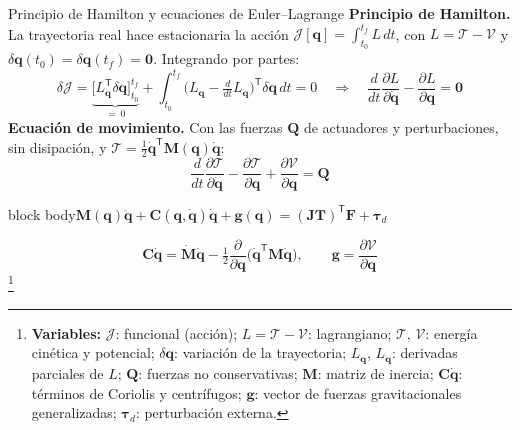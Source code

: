 \documentclass[aspectratio=169,10pt]{beamer}
\newcommand{\vect}[1]{\bm{#1}}
\newcommand{\T}{^{\mathsf{T}}}
\newcommand{\variables}[1]{\begingroup\renewcommand{\thefootnote}{}\footnote[frame]{\textbf{Variables:} #1}\addtocounter{footnote}{-1}\endgroup}
\newcommand{\resultado}[1]{\par\smallskip\begin{beamercolorbox}[rounded=true,sep=0.45em,center]{block body}#1\end{beamercolorbox}\par\smallskip}
\begin{document}
\begin{frame}{Principio de Hamilton y ecuaciones de Euler--Lagrange}
\small
\textbf{Principio de Hamilton.} La trayectoria real hace estacionaria la acción $\mathcal J[\vect q] = \int_{t_0}^{t_f}L\,dt$, con $L = \mathcal T - \mathcal V$ y $\delta\vect q(t_0) = \delta\vect q(t_f) = \vect 0$. Integrando por partes:
\[
\delta\mathcal J = \underbrace{\Big[L_{\dot{\vect q}}\T\delta\vect q\Big]_{t_0}^{t_f}}_{=\,0} + \int_{t_0}^{t_f}\Big(L_{\vect q} - \tfrac{d}{dt}L_{\dot{\vect q}}\Big)\T\delta\vect q\,dt = 0
\quad\Rightarrow\quad
\frac{d}{dt}\frac{\partial L}{\partial\dot{\vect q}} - \frac{\partial L}{\partial\vect q} = \vect 0
\]
\textbf{Ecuación de movimiento.} Con las fuerzas $\vect Q$ de actuadores y perturbaciones, sin disipación, y $\mathcal T = \tfrac12\dot{\vect q}\T\vect M(\vect q)\dot{\vect q}$:
\[
\frac{d}{dt}\frac{\partial\mathcal T}{\partial\dot{\vect q}} - \frac{\partial\mathcal T}{\partial\vect q} + \frac{\partial\mathcal V}{\partial\vect q} = \vect Q
\]
\resultado{$\displaystyle \vect M(\vect q)\ddot{\vect q} + \vect C(\vect q, \dot{\vect q})\dot{\vect q} + \vect g(\vect q) = (\vect J\vect T)\T\vect F + \vect\tau_d$}
\[
\vect C\dot{\vect q} = \dot{\vect M}\dot{\vect q} - \tfrac12\frac{\partial}{\partial\vect q}\big(\dot{\vect q}\T\vect M\dot{\vect q}\big),\qquad \vect g = \frac{\partial\mathcal V}{\partial\vect q}
\]
\variables{$\mathcal J$: funcional (acción); $L = \mathcal T - \mathcal V$: lagrangiano; $\mathcal T$, $\mathcal V$: energía cinética y potencial; $\delta\vect q$: variación de la trayectoria; $L_{\vect q}$, $L_{\dot{\vect q}}$: derivadas parciales de $L$; $\vect Q$: fuerzas no conservativas; $\vect M$: matriz de inercia; $\vect C\dot{\vect q}$: términos de Coriolis y centrífugos; $\vect g$: vector de fuerzas gravitacionales generalizadas; $\vect\tau_d$: perturbación externa.}
\end{frame}
\end{document}
